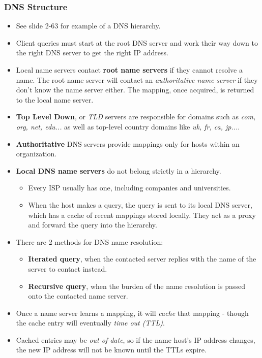 \documentclass{article}
\begin{document}
\subsubsection{DNS Structure}
\begin{itemize}
\item See slide 2-63 for example of a DNS hierarchy.
\item Client queries must start at the root DNS server and work their way down to the right DNS server to get the right IP address.
\item Local name servers contact {\bf root name servers} if they cannot resolve a name. The root name server will contact an {\it authoritative name server} if they don't know the name server either. The mapping, once acquired, is returned to the local name server.
\item {\bf Top Level Down}, or {\it TLD} servers are responsible for domains such as {\it com, org, net, edu...} as well as top-level country domains like {\it uk, fr, ca, jp...}.
\item {\bf Authoritative} DNS servers provide mappings only for hosts within an organization.
\item {\bf Local DNS name servers} do not belong strictly in a hierarchy.
\begin{itemize}
\item Every ISP usually has one, including companies and universities.
\item When the host makes a query, the query is sent to its local DNS server, which has a cache of recent mappings stored locally. They act as a proxy and forward the query into the hierarchy.
\end{itemize}

\clearpage

\item There are 2 methods for DNS name resolution:
\begin{itemize}
\item {\bf Iterated query}, when the contacted server replies with the name of the server to contact instead.
\item {\bf Recursive query}, when the burden of the name resolution is passed onto the contacted name server.
\end{itemize}
\item Once a name server learns a mapping, it will {\it cache} that mapping - though the cache entry will eventually {\it time out (TTL)}.
\item Cached entries may be {\it out-of-date}, so if the name host's IP address changes, the new IP address will not be known until the TTLs expire.
\end{itemize}
\end{document}
